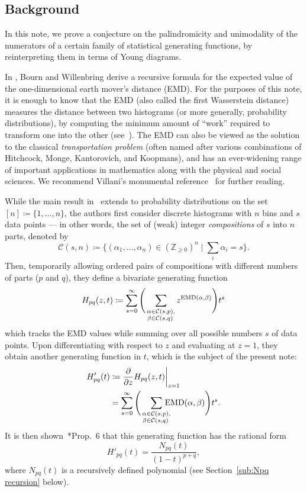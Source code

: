 \documentclass[11pt]{amsart}
\theoremstyle{plain}
\theoremstyle{definition}
\numberwithin{equation}{section}
\newcommand{\C}{\mathcal{C}}
\newcommand{\EMD}{{\rm EMD}}
\begin{document}
\subsection{Background}

In this note, we prove a conjecture on the palindromicity and unimodality of the numerators of a certain family of statistical generating functions, by reinterpreting them in terms of Young diagrams.

In \cite{BW}, Bourn and Willenbring derive a recursive formula for the expected value of the one-dimensional earth mover's distance (EMD).
For the purposes of this note, it is enough to know that the EMD (also called the first Wasserstein distance) measures the distance between two histograms (or more generally, probability distributions), by computing the minimum amount of ``work'' required to transform one into the other (see~\cite{Rubner}).
The EMD can also be viewed as the solution to the classical \emph{transportation problem} (often named after various combinations of Hitchcock, Monge, Kantorovich, and Koopmans), and has an ever-widening range of important applications in mathematics along with the physical and social sciences.
We recommend Villani's monumental reference~\cite{Villani} for further reading.

While the main result in~\cite{BW} extends to probability distributions on the set $[n] \coloneqq \{1, \ldots, n\}$, the authors first consider discrete histograms with $n$ bins and $s$ data points --- in other words, the set of (weak) integer \emph{compositions} of $s$ into $n$ parts, denoted by
\[
    \C(s,n) \coloneqq \Big\{ (\alpha_1, \ldots, \alpha_n) \in (\mathbb{Z}_{\geq 0})^n \; \Big| \; \textstyle\sum_i \alpha_i = s \Big\}.
\]
Then, temporarily allowing ordered pairs of compositions with different numbers of parts ($p$ and $q$), they define a bivariate generating function
\begin{equation}
    \label{Hpq}
    H_{pq}(z,t) \coloneqq \sum_{s=0}^\infty \Bigg(\sum_{\substack{\alpha \in \C(s,p), \\ \beta \in \C(s,q)\phantom{,}}} z^{\EMD(\alpha,\beta)}\Bigg)t^s
\end{equation}
which tracks the EMD values while summing over all possible numbers $s$ of data points.
Upon differentiating with respect to $z$ and evaluating at $z=1$, they obtain another generating function in $t$, which is the subject of the present note:
\begin{align}
    H'_{pq}(t) &\coloneqq \frac{\partial}{\partial z} H_{pq}(z,t)\bigg|_{z=1} \nonumber \\
    &= \sum_{s=0}^\infty \Bigg(\sum_{\substack{\alpha \in \C(s,p), \\ \beta \in \C(s,q)\phantom{,}}} \hspace{-2ex} \EMD(\alpha,\beta)\Bigg) t^s. \label{H prime}
\end{align}
It is then shown~\cite{BW}*{Prop.~6} that this generating function has the rational form
\[
    H'_{pq}(t) = \frac{N_{pq}(t)}{(1-t)^{p+q}},
\]
where $N_{pq}(t)$ is a recursively defined polynomial (see Section~\ref{sub:Npq recursion} below).
\end{document}
